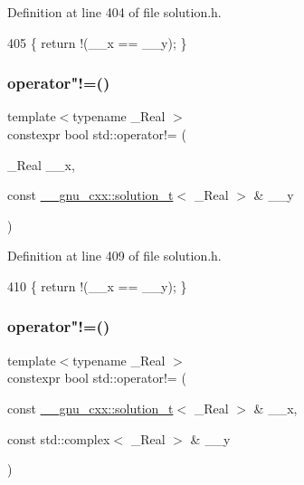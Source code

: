 Definition at line 404 of file solution.\+h.


\begin{DoxyCode}
405     \{ \textcolor{keywordflow}{return} !(\_\_x == \_\_y); \}
\end{DoxyCode}
\mbox{\label{namespacestd_ac8ab440760f8eab57232be8417861387}} 
\subsubsection{\texorpdfstring{operator"!=()}{operator!=()}\hspace{0.1cm}{\footnotesize\ttfamily [3/5]}}
{\footnotesize\ttfamily template$<$typename \+\_\+\+Real $>$ \\
constexpr bool std\+::operator!= (\begin{DoxyParamCaption}\item[{\+\_\+\+Real}]{\+\_\+\+\_\+x,  }\item[{const \hyperlink{namespace____gnu__cxx_ae20ea642de50eb361074c62676b0159c}{\+\_\+\+\_\+gnu\+\_\+cxx\+::solution\+\_\+t}$<$ \+\_\+\+Real $>$ \&}]{\+\_\+\+\_\+y }\end{DoxyParamCaption})}



Definition at line 409 of file solution.\+h.


\begin{DoxyCode}
410     \{ \textcolor{keywordflow}{return} !(\_\_x == \_\_y); \}
\end{DoxyCode}
\mbox{\label{namespacestd_a613014e2e7afb3c131c9530988e20417}} 
\subsubsection{\texorpdfstring{operator"!=()}{operator!=()}\hspace{0.1cm}{\footnotesize\ttfamily [4/5]}}
{\footnotesize\ttfamily template$<$typename \+\_\+\+Real $>$ \\
constexpr bool std\+::operator!= (\begin{DoxyParamCaption}\item[{const \hyperlink{namespace____gnu__cxx_ae20ea642de50eb361074c62676b0159c}{\+\_\+\+\_\+gnu\+\_\+cxx\+::solution\+\_\+t}$<$ \+\_\+\+Real $>$ \&}]{\+\_\+\+\_\+x,  }\item[{const std\+::complex$<$ \+\_\+\+Real $>$ \&}]{\+\_\+\+\_\+y }\end{DoxyParamCaption})}



